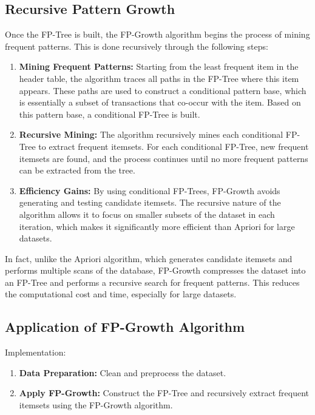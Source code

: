 \documentclass{article}
\begin{document}
\subsection{Recursive Pattern Growth}
Once the FP-Tree is built, the FP-Growth algorithm begins the process of mining frequent patterns. This is done recursively through the following steps:

\begin{enumerate}
    \item \textbf{Mining Frequent Patterns:} Starting from the least frequent item in the header table, the algorithm traces all paths in the FP-Tree where this item appears. These paths are used to construct a conditional pattern base, which is essentially a subset of transactions that co-occur with the item. Based on this pattern base, a conditional FP-Tree is built.

    \item \textbf{Recursive Mining:} The algorithm recursively mines each conditional FP-Tree to extract frequent itemsets. For each conditional FP-Tree, new frequent itemsets are found, and the process continues until no more frequent patterns can be extracted from the tree.

    \item \textbf{Efficiency Gains:} By using conditional FP-Trees, FP-Growth avoids generating and testing candidate itemsets. The recursive nature of the algorithm allows it to focus on smaller subsets of the dataset in each iteration, which makes it significantly more efficient than Apriori for large datasets.
\end{enumerate}

In fact, unlike the Apriori algorithm, which generates candidate itemsets and performs multiple scans of the database, FP-Growth compresses the dataset into an FP-Tree and performs a recursive search for frequent patterns. This reduces the computational cost and time, especially for large datasets.

\subsection{Application of FP-Growth Algorithm}
Implementation:
\begin{enumerate}
    \item \textbf{Data Preparation:} Clean and preprocess the dataset.
    \item \textbf{Apply FP-Growth:} Construct the FP-Tree and recursively extract frequent itemsets using the FP-Growth algorithm.
\end{enumerate}
\end{document}
